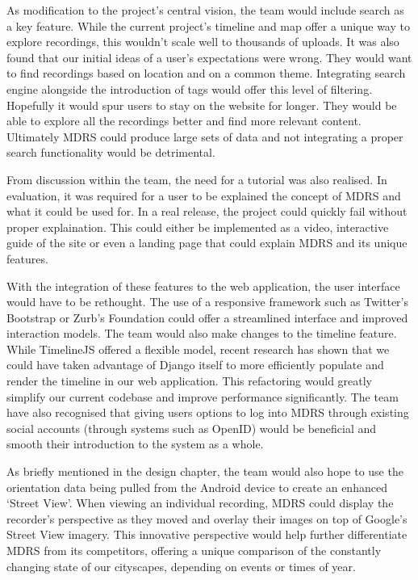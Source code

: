 \documentclass{l3proj}
\begin{document}
As modification to the project's central vision, the team would include search as a key feature. While the current project's timeline and map offer a unique way to explore recordings, this wouldn't scale well to thousands of uploads. It was also found that our initial ideas of a user's expectations were wrong. They would want to find recordings based on location and on a common theme. Integrating search engine alongside the introduction of tags would offer this level of filtering. Hopefully it would spur users to stay on the website for longer. They would be able to explore all the recordings better and find more relevant content. Ultimately MDRS could produce large sets of data and not integrating a proper search functionality would be detrimental.

From discussion within the team, the need for a tutorial was also realised. In evaluation, it was required for a user to be explained the concept of MDRS and what it could be used for. In a real release, the project could quickly fail without proper explaination. This could either be implemented as a video, interactive guide of the site or even a landing page that could explain MDRS and its unique features.

With the integration of these features to the web application, the user interface would have to be rethought. The use of a responsive framework such as Twitter's Bootstrap or Zurb's Foundation\cite{foundation} could offer a streamlined interface and improved interaction models. The team would also make changes to the timeline feature. While TimelineJS offered a flexible model, recent research has shown that we could have taken advantage of \gls{Django} itself to more efficiently populate and render the timeline in our web application. This refactoring would greatly simplify our current codebase and improve performance significantly. The team have also recognised that giving users options to log into MDRS through existing social accounts (through systems such as OpenID\cite{openid}) would be beneficial and smooth their introduction to the system as a whole.

As briefly mentioned in the design chapter, the team would also hope to use the orientation data being pulled from the Android device to create an enhanced ‘Street View’. When viewing an individual recording, MDRS could display the recorder’s perspective as they moved and overlay their images on top of Google’s Street View imagery. This innovative perspective would help further differentiate MDRS from its competitors, offering a unique comparison of the constantly changing state of our cityscapes, depending on events or times of year.
\end{document}
